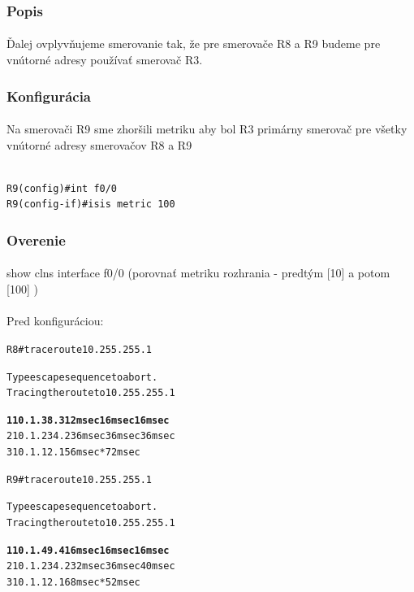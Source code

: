 \documentclass[12pt,twoside,a4paper]{report}
\begin{document}
\subsubsection{Popis}
\paragraph{}
Ďalej ovplyvňujeme smerovanie tak, že pre smerovače R8 a R9 budeme pre vnútorné adresy používať smerovač R3.


\subsubsection{Konfigurácia}
\paragraph{}
Na smerovači R9 sme zhoršili metriku aby bol R3 primárny smerovač pre všetky vnútorné adresy smerovačov R8 a R9

\noindent
{\selectfont
\begin{small}
\begin{verbatim}

R9(config)#int f0/0
R9(config-if)#isis metric 100
\end{verbatim}
\end{small}
}

\subsubsection{Overenie}
\paragraph{}
show clns interface f0/0 (porovnať metriku rozhrania - predtým [10] a potom [100] )


\paragraph{}
Pred konfiguráciou:

\noindent
{\selectfont
\begin{small}
\begin{alltt}
R8#traceroute 10.255.255.1

Type escape sequence to abort.
Tracing the route to 10.255.255.1

\textbf{  1 10.1.38.3 12 msec 16 msec 16 msec}
  2 10.1.234.2 36 msec 36 msec 36 msec
  3 10.1.12.1 56 msec *  72 msec



R9#traceroute 10.255.255.1

Type escape sequence to abort.
Tracing the route to 10.255.255.1

\textbf{  1 10.1.49.4 16 msec 16 msec 16 msec}
  2 10.1.234.2 32 msec 36 msec 40 msec
  3 10.1.12.1 68 msec *  52 msec

\end{alltt}
\end{small}
}
\end{document}
